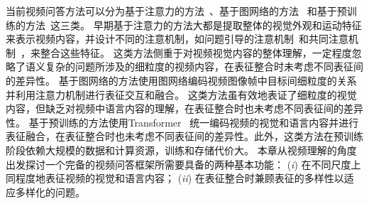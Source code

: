 当前视频问答方法可以分为基于注意力的方法~\cite{xu2017video,jiang2020divide,gao2018motion,zha2019spatiotemporal,le2020hierarchical}、基于图网络的方法~\cite{jiang2020reasoning,huang2020location,wang2021dualvgr,seo2021attend,park2021bridge} 和基于预训练的方法~\cite{amrani2021noise,lei2021less,seo2021look,yang2021just}这三类。
早期基于注意力的方法大都是提取整体的视觉外观和运动特征来表示视频内容，并设计不同的注意机制，如问题引导的注意机制~\cite{xu2017video,jiang2020divide}和共同注意机制~\cite{gao2018motion,zha2019spatiotemporal}，来整合这些特征。
这类方法侧重于对视频视觉内容的整体理解，一定程度忽略了语义复杂的问题所涉及的细粒度的视频内容，在表征整合时未考虑不同表征间的差异性。
基于图网络的方法使用图网络编码视频图像帧中目标间细粒度的关系并利用注意力机制进行表征交互和融合。
这类方法虽有效地表证了细粒度的视觉内容，但缺乏对视频中语言内容的理解，在表征整合时也未考虑不同表征间的差异性。
基于预训练的方法使用Transformer~\cite{vaswani2017attention} 统一编码视频的视觉和语言内容并进行表征融合，在表征整合时也未考虑不同表征间的差异性。此外，这类方法在预训练阶段依赖大规模的数据和计算资源，训练和存储代价大。
本章从视频理解的角度出发探讨一个完备的视频问答框架所需要具备的两种基本功能：
(\emph{i}) 在不同尺度上同程度地表征视频的视觉和语言内容； 
(\emph{ii}) 在表征整合时兼顾表征的多样性以适应多样化的问题。


